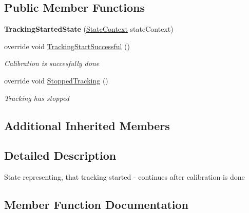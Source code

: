 \subsection*{Public Member Functions}
\begin{DoxyCompactItemize}
\item 
\mbox{\label{class_chess_tracking_1_1_controlling_elements_1_1_program_state_1_1_states_1_1_tracking_started_state_a6006483b266ef1c8106929de8a84668c}} 
{\bfseries Tracking\+Started\+State} (\mbox{\hyperlink{class_chess_tracking_1_1_controlling_elements_1_1_program_state_1_1_state_context}{State\+Context}} state\+Context)
\item 
override void \mbox{\hyperlink{class_chess_tracking_1_1_controlling_elements_1_1_program_state_1_1_states_1_1_tracking_started_state_aa1840f95aae0d1aa49a898b1387bdda5}{Tracking\+Start\+Successful}} ()
\begin{DoxyCompactList}\small\item\em Calibration is succesfully done \end{DoxyCompactList}\item 
override void \mbox{\hyperlink{class_chess_tracking_1_1_controlling_elements_1_1_program_state_1_1_states_1_1_tracking_started_state_af5c55ca3a77c8b0d227d688ba3b2fc69}{Stopped\+Tracking}} ()
\begin{DoxyCompactList}\small\item\em Tracking has stopped \end{DoxyCompactList}\end{DoxyCompactItemize}
\subsection*{Additional Inherited Members}


\subsection{Detailed Description}
State representing, that tracking started -\/ continues after calibration is done 



\subsection{Member Function Documentation}
\mbox{\label{class_chess_tracking_1_1_controlling_elements_1_1_program_state_1_1_states_1_1_tracking_started_state_af5c55ca3a77c8b0d227d688ba3b2fc69}} 
